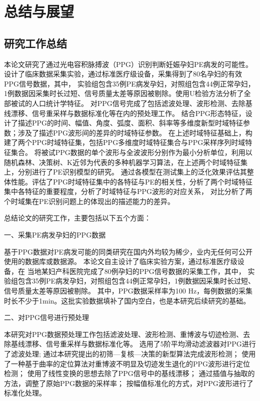 \chapter{总结与展望}
\section{研究工作总结}
本论文研究了通过光电容积脉搏波（PPG）识别判断妊娠孕妇PE病发的可能性。设计了临床数据采集实验，通过标准医疗级设备，采集得到了80名孕妇的有效PPG信号数据，其中，
实验组包含35例PE病发孕妇，对照组包含44例正常孕妇，1例数据因采集时长过短、信号质量太差等原因被剔除。使用U检验方法分析了全部被试的人口统计学特征。
对PPG信号完成了包括滤波处理、波形检测、去除基线漂移、信号重采样与数据标准化等在内的预处理工作。
结合PPG形态特征，设计了描述PPG的时间、幅值、角度、弧度、面积、斜率等多维度新型时域特征参数；涉及了描述PPG波形间的差异的时域特征参数。
在上述时域特征基础上，构建了两个PPG时域特征集，包括PPG多维度时域特征集合与PPG采样序列时域特征集合。
将被试PPG数据的单个波形与全波波形分别作为最小分析单位，利用以随机森林、决策树、K近邻为代表的多种机器学习算法，在上述两个时域特征集上，分别进行了PE识别模型的研究。
通过各模型在测试集上的泛化效果评估其整体性能。评估了PPG时域特征集中的各特征与PE的相关性，分析了两个时域特征集中各特征的重要程度，分析了时域特征与PPG波形的对应关系，
对比分析了两个时域集在PE识别问题上的体现出的描述能力的差异。

总结论文的研究工作，主要包括以下五个方面：

一、采集PE病发孕妇的PPG数据

基于PPG数据对PE病发可能的同类研究在国内外均较为稀少，业内无任何可公开使用的数据库或数据源。
本论文自主设计了临床实验方案，通过标准医疗级设备，在%
当地某妇产科医院完成了80例孕妇的PPG信号数据的采集工作，其中，
实验组包含35例PE病发孕妇，对照组包含44例正常孕妇，1例数据因采集时长过短、信号质量太差等原因被剔除。
其中，PPG数据采样率为100 Hz，每例数据的采集时长不少于1min。这批实验数据填补了国内空白，也是本研究后续研究的基础。

二、对PPG信号进行预处理

本研究对PPG数据预处理工作包括滤波处理、波形检测、重博波与切迹检测、去除基线漂移、信号重采样与数据标准化等。
选用了5阶平均滑动滤波器对PPG进行了滤波处理;
通过本研究提出的初筛—复核—决策的新型算法完成波形检测；
使用了一种基于曲率的定位算法对重博波不明显及切迹发生退化的PPG波形进行定位检测；
使用了线性变换的思想去除了PPG信号中的基线漂移；
通过插值与抽取的方法，调整了原始PPG数据的采样率；
按幅值标准化的方式，对PPG波形进行了标准化处理。


